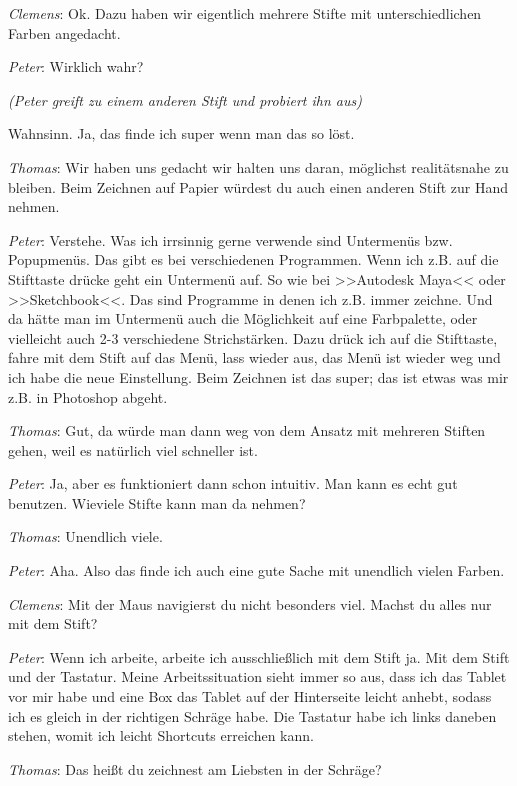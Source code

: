 \medskip \emph{Clemens}: Ok. Dazu haben wir eigentlich mehrere Stifte mit unterschiedlichen Farben angedacht.

\medskip \emph{Peter}: Wirklich wahr?

\smallskip \emph{(Peter greift zu einem anderen Stift und probiert ihn aus)}

\smallskip Wahnsinn. Ja, das finde ich super wenn man das so löst.

\medskip \emph{Thomas}: Wir haben uns gedacht wir halten uns daran, möglichst realitätsnahe zu bleiben. Beim Zeichnen auf Papier würdest du auch einen anderen Stift zur Hand nehmen.

\medskip \emph{Peter}: Verstehe. Was ich irrsinnig gerne verwende sind Untermenüs bzw. Popupmenüs. Das gibt es bei verschiedenen Programmen. Wenn ich z.B. auf die Stifttaste drücke geht ein Untermenü auf. So wie bei >>Autodesk Maya<< oder >>Sketchbook<<. Das sind Programme in denen ich z.B. immer zeichne. Und da hätte man im Untermenü auch die Möglichkeit auf eine Farbpalette, oder vielleicht auch 2-3 verschiedene Strichstärken. Dazu drück ich auf die Stifttaste, fahre mit dem Stift auf das Menü, lass wieder aus, das Menü ist wieder weg und ich habe die neue Einstellung. Beim Zeichnen ist das super; das ist etwas was mir z.B. in Photoshop abgeht.

\medskip \emph{Thomas}: Gut, da würde man dann weg von dem Ansatz mit mehreren Stiften gehen, weil es natürlich viel schneller ist.

\medskip \emph{Peter}: Ja, aber es funktioniert dann schon intuitiv. Man kann es echt gut benutzen. Wieviele Stifte kann man da nehmen?

\medskip \emph{Thomas}: Unendlich viele.

\medskip \emph{Peter}: Aha. Also das finde ich auch eine gute Sache mit unendlich vielen Farben.

\medskip \emph{Clemens}: Mit der Maus navigierst du nicht besonders viel. Machst du alles nur mit dem Stift?

\medskip \emph{Peter}: Wenn ich arbeite, arbeite ich ausschließlich mit dem Stift ja. Mit dem Stift und der Tastatur. Meine Arbeitssituation sieht immer so aus, dass ich das Tablet vor mir habe und eine Box das Tablet auf der Hinterseite leicht anhebt, sodass ich es gleich in der richtigen Schräge habe. Die Tastatur habe ich links daneben stehen, womit ich leicht Shortcuts erreichen kann.

\medskip \emph{Thomas}: Das heißt du zeichnest am Liebsten in der Schräge?

